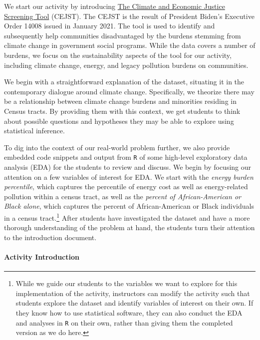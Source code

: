 \documentclass[
  12pt,
  letterpaper,
  DIV=11,
  numbers=noendperiod]{scrartcl}
\let\oldparagraph\paragraph
\renewcommand{\paragraph}[1]{\oldparagraph{#1}\mbox{}}
\begin{document}
We start our activity by introducing
\href{https://screeningtool.geoplatform.gov/en/}{The Climate and
Economic Justice Screening Tool} (CEJST). The CEJST is the result of
President Biden's Executive Order 14008 issued in January 2021. The tool
is used to identify and subsequently help communities disadvantaged by
the burdens stemming from climate change in government social programs.
While the data covers a number of burdens, we focus on the
sustainability aspects of the tool for our activity, including climate
change, energy, and legacy pollution burdens on communities.

We begin with a straightforward explanation of the dataset, situating it
in the contemporary dialogue around climate change. Specifically, we
theorize there may be a relationship between climate change burdens and
minorities residing in Census tracts. By providing them with this
context, we get students to think about possible questions and
hypotheses they may be able to explore using statistical inference.

To dig into the context of our real-world problem further, we also
provide embedded code snippets and output from \texttt{R} of some
high-level exploratory data analysis (EDA) for the students to review
and discuss. We begin by focusing our attention on a few variables of
interest for EDA. We start with the \emph{energy burden percentile},
which captures the percentile of energy cost as well as energy-related
pollution within a census tract, as well as the \emph{percent of
African-American or Black alone}, which captures the percent of
African-American or Black individuals in a census tract.\footnote{While
  we guide our students to the variables we want to explore for this
  implementation of the activity, instructors can modify the activity
  such that students explore the dataset and identify variables of
  interest on their own. If they know how to use statistical software,
  they can also conduct the EDA and analyses in \texttt{R} on their own,
  rather than giving them the completed version as we do here.} After
students have investigated the dataset and have a more thorough
understanding of the problem at hand, the students turn their attention
to the introduction document.

\hypertarget{sec-activity-intro}{%
\paragraph{Activity Introduction}\label{sec-activity-intro}}
\end{document}
